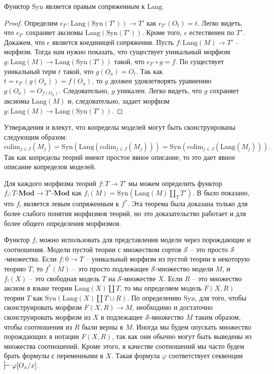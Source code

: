 \documentclass[reqno]{amsart}
\theoremstyle{definition}
\theoremstyle{remark}
\newcommand{\bcat}[1]{\mathbf{#1}}
\newcommand{\Mod}[1]{#1\text{-}\bcat{Mod}}
\newcommand{\fs}[1]{\mathrm{#1}}
\newcommand{\Lang}{\fs{Lang}}
\newcommand{\Syn}{\fs{Syn}}
\newcommand{\colim}{\fs{colim}}
\begin{document}
\begin{prop}
Функтор $\Syn$ является правым сопряженным к $\Lang$.
\end{prop}
\begin{proof}
Определим $\epsilon_{T'} : \Lang(\Syn(T')) \to T'$ как $\epsilon_{T'}(O_t) = t$.
Легко видеть, что $\epsilon_{T'}$ сохраняет аксиомы $\Lang(\Syn(T'))$.
Кроме того, $\epsilon$ естественен по $T'$.
Докажем, что $\epsilon$ является коединицей сопряжения.
Пусть $f : \Lang(M) \to T'$ -- морфизм.
Тогда нам нужно показать, что существует уникальный морфизм $g : \Lang(M) \to \Lang(\Syn(T'))$ такой, что $\epsilon_{T'} \circ g = f$.
По  существует уникальный терм $t$ такой, что $g(O_a) = O_t$.
Так как $t = \epsilon_{T'}(g(O_a)) = f(O_a)$, то $g$ должен удовлетворять уравнению $g(O_a) = O_{f(O_a)}$.
Следовательно, $g$ уникален.
Легко видеть, что $g$ сохраняет аксиомы $\Lang(M)$ и, следовательно, задает морфизм $g : \Lang(M) \to \Lang(\Syn(T'))$.
\end{proof}

\begin{remark}
Утверждения  и  влекут, что копределы моделей могут быть сконструированы следующим образом:
\[ \colim_{j \in J}(M_j) = \Syn(\Lang(\colim_{j \in J}(M_j))) = \Syn(\colim_{j \in J}(\Lang(M_j))). \]
Так как копределы теорий имеют простое явное описание, то это дает явное описание копределов моделей.
\end{remark}

Для каждого морфизма теорий $f : T \to T'$ мы можем определить функтор $f_! : \Mod{T} \to \Mod{T'}$ как $f_!(M) = \Syn(\Lang(M) \amalg_{T} T')$.
В \cite[Theorem~29]{PHL} было показано, что $f_!$ является левым сопряженным к $f^*$.
Эта теорема была доказана только для более слабого понятия морфизмов теорий, но это доказательство работает и для более общего определения морфизмов.

Функтор $f_!$ можно использовать для представления модели через порождающие и соотношения.
Модели пустой теории с множеством сортов $\mathcal{S}$ -- это просто $\mathcal{S}$-множества.
Если $f : 0 \to T$ -- уникальный морфизм из пустой теории в некоторую теорию $T$, то $f^*(M)$ -- это просто подлежащее $\mathcal{S}$-множество модели $M$, и $f_!(X)$ -- это свободная модель $T$ на $\mathcal{S}$-множестве $X$.
Если $R$ -- это множество аксиом в языке теории $\Lang(X) \amalg T$, то мы определяем модель $F(X,R)$ теории $T$ как $\Syn(\Lang(X) \amalg T \cup R)$.
По определению $\Syn$, для того, чтобы сконструировать морфизм $F(X,R) \to M$, необходимо и достаточно сконструировать морфизм из $X$ в подлежащее $\mathcal{S}$-множество $M$ таким образом, чтобы соотношения из $R$ были верны в $M$.
Иногда мы будем опускать множество порождающих в нотации $F(X,R)$, так как они обычно могут быть выведены из множества соотношений.
Кроме этого, в качестве соотношений мы часто будем брать формулы с переменными в $X$.
Такая формула $\varphi$ соответствует секвенции $\sststile{}{} \varphi[O_x/x]$.
\end{document}
